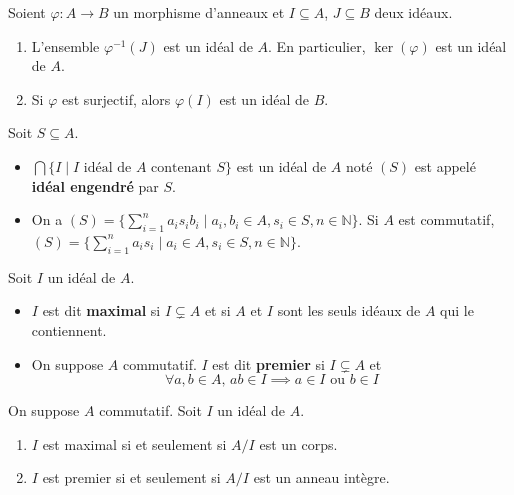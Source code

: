 	\begin{proposition}
		Soient $\varphi : A \rightarrow B$ un morphisme d'anneaux et $I \subseteq A$, $J \subseteq B$ deux idéaux.
		\begin{enumerate}[label=(\roman*)]
			\item L'ensemble $\varphi^{-1}(J)$ est un idéal de $A$. En particulier, $\ker(\varphi)$ est un idéal de $A$.
			\item Si $\varphi$ est surjectif, alors $\varphi(I)$ est un idéal de $B$.
		\end{enumerate}
	\end{proposition}

	\begin{definition}
		Soit $S \subseteq A$.
		\begin{itemize}
			\item $\bigcap \{ I \mid I \text{ idéal de } A \text{ contenant } S \}$ est un idéal de $A$ noté $(S)$ est appelé \textbf{idéal engendré} par $S$.
			\item On a $(S) = \{ \sum_{i=1}^n a_i s_i b_i \mid a_i, b_i \in A, s_i \in S, n \in \mathbb{N} \}$. Si $A$ est commutatif, $(S) = \{ \sum_{i=1}^n a_i s_i \mid a_i \in A, s_i \in S, n \in \mathbb{N} \}$.
		\end{itemize}
	\end{definition}

	\reference{31}

	\begin{definition}
		Soit $I$ un idéal de $A$.
		\begin{itemize}
			\item $I$ est dit \textbf{maximal} si $I \subsetneq A$ et si $A$ et $I$ sont les seuls idéaux de $A$ qui le contiennent.
			\item On suppose $A$ commutatif. $I$ est dit \textbf{premier} si $I \subsetneq A$ et
			\[ \forall a, b \in A, \, ab \in I \implies a \in I \text{ ou } b \in I \]
		\end{itemize}
	\end{definition}

	\begin{proposition}
		On suppose $A$ commutatif. Soit $I$ un idéal de $A$.
		\begin{enumerate}[label=(\roman*)]
			\item $I$ est maximal si et seulement si $A/I$ est un corps.
			\item $I$ est premier si et seulement si $A/I$ est un anneau intègre.
		\end{enumerate}
	\end{proposition}

